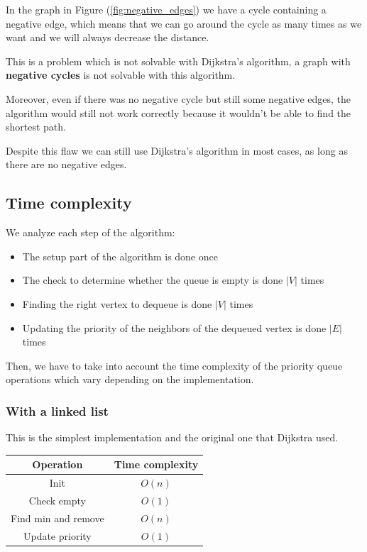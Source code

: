 \documentclass[12pt]{extarticle}
\begin{document}
In the graph in Figure (\ref{fig:negative_edges}) we have a cycle containing a negative edge, which means that we can go around the cycle as many times as we want and we will always decrease the distance.

This is a problem which is not solvable with Dijkstra's algorithm, a graph with \textbf{negative cycles} is not solvable with this algorithm.

Moreover, even if there was no negative cycle but still some negative edges, the algorithm would still not work correctly because it wouldn't be able to find the shortest path.

Despite this flaw we can still use Dijkstra's algorithm in most cases, as long as there are no negative edges.

\subsection{Time complexity}

We analyze each step of the algorithm:

\begin{itemize}
    \item The setup part of the algorithm is done once
    \item The check to determine whether the queue is empty is done $|V|$ times
    \item Finding the right vertex to dequeue is done $|V|$ times
    \item Updating the priority of the neighbors of the dequeued vertex is done $|E|$ times
\end{itemize}

Then, we have to take into account the time complexity of the priority queue operations which vary depending on the implementation.

\subsubsection{With a linked list}

This is the simplest implementation and the original one that Dijkstra used.

\begin{center}
    \begin{tabular}{|c|c|}
        \hline
        \textbf{Operation}  & \textbf{Time complexity} \\
        \hline
        Init                & $O(n)$                   \\
        Check empty         & $O(1)$                   \\
        Find min and remove & $O(n)$                   \\
        Update priority     & $O(1)$                   \\
        \hline
    \end{tabular}
    \label{tab:priorityqueue_linkedlist}
\end{center}
\end{document}
